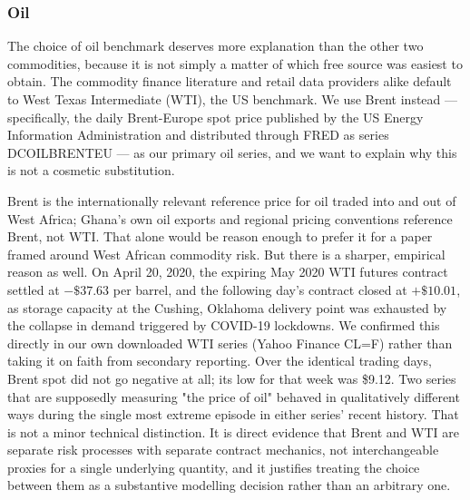 \documentclass[preprint,12pt,authoryear]{elsarticle}
\begin{document}
\subsubsection{Oil}

The choice of oil benchmark deserves more explanation than the other
two commodities, because it is not simply a matter of which free
source was easiest to obtain. The commodity finance literature and
retail data providers alike default to West Texas Intermediate (WTI),
the US benchmark. We use Brent instead — specifically, the daily
Brent-Europe spot price published by the US Energy Information
Administration and distributed through FRED as series DCOILBRENTEU —
as our primary oil series, and we want to explain why this is not a
cosmetic substitution.

Brent is the internationally relevant reference price for oil traded
into and out of West Africa; Ghana's own oil exports and regional
pricing conventions reference Brent, not WTI. That alone would be
reason enough to prefer it for a paper framed around West African
commodity risk. But there is a sharper, empirical reason as well. On
April 20, 2020, the expiring May 2020 WTI futures contract settled at
$-\$37.63$ per barrel, and the following day's contract closed at
$+\$10.01$, as storage capacity at the Cushing, Oklahoma delivery
point was exhausted by the collapse in demand triggered by COVID-19
lockdowns. We confirmed this directly in our own downloaded WTI
series (Yahoo Finance CL=F) rather than taking it on faith from
secondary reporting. Over the identical trading days, Brent spot did
not go negative at all; its low for that week was \$9.12. Two series
that are supposedly measuring "the price of oil" behaved in
qualitatively different ways during the single most extreme episode
in either series' recent history. That is not a minor technical
distinction. It is direct evidence that Brent and WTI are separate
risk processes with separate contract mechanics, not interchangeable
proxies for a single underlying quantity, and it justifies treating
the choice between them as a substantive modelling decision rather
than an arbitrary one.
\end{document}
